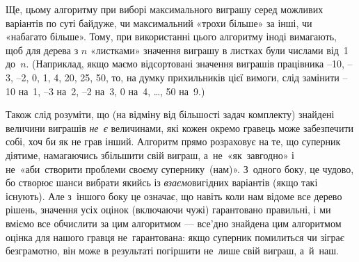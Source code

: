 Ще, цьому алгоритму при виборі максимального виграшу серед можливих варіантів по суті байдуже, чи максимальний «трохи більше» за інші, чи «набагато більше».
Тому, при використанні цього алгоритму іноді вимагають, щоб для д{\it е}рева з $n$ «листками» значення виграшу в листках були числами від~1 до~$n$. (Наприклад, якщо маємо відсортовані значення виграшів працівника –10, –3, –2, 0, 1, 4, 20, 25, 50, то, на думку прихильників цієї вимоги, слід замінити –10 на~1, –3 на~2, –2 на~3, 0 на~4, \dots, 50 на~9.)

Також слід розуміти, що (на відміну від більшості задач комплекту) знайдені величини виграшів {\it не~є} величинами, які кожен окремо гравець може забезпечити собі, хоч би як не грав інший. Алгоритм прямо розраховує на те, що суперник діятиме, намагаючись збільшити свій виграш, а~не~«як~завгодно» і не~«аби~створити проблеми своєму супернику~(нам)». З~одного боку, це чудово, бо створює шанси вибрати якийсь із {\it взаємо}вигідних варіантів (якщо такі існують). Але з~іншого боку це означає, що навіть коли нам відоме все дерево рішень, значення усіх оцінок (включаючи чужі) гарантовано правильні, і ми вміємо все обчислити за цим алгоритмом --- все'дно знайдена цим алгоритмом оцінка для нашого гравця не~гарантована: якщо суперник помилиться чи зіграє безграмотно, він може в результаті погіршити не~лише свій виграш, а~й~наш.
